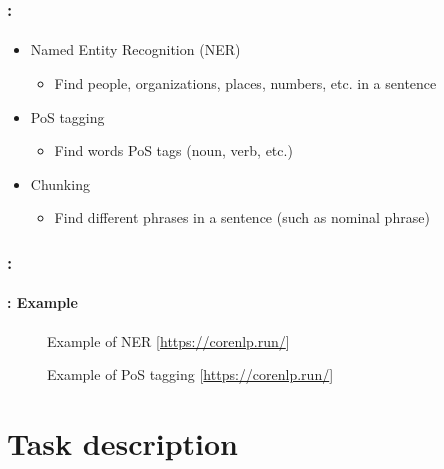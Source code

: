 \documentclass[xcolor=table]{beamer}
\begin{document}
\begin{frame}
	\frametitle{\insertshortsubtitle: \insertsection}
	\framesubtitle{\insertsubsection}

	\begin{itemize}
		\item Named Entity Recognition (NER)
		\begin{itemize}
			\item Find people, organizations, places, numbers, etc. in a sentence
		\end{itemize}
		\item PoS tagging
		\begin{itemize}
			\item Find words PoS tags (noun, verb, etc.)
		\end{itemize}
		\item Chunking
		\begin{itemize}
			\item Find different phrases in a sentence (such as nominal phrase)
		\end{itemize}
	\end{itemize}

\end{frame}

\begin{frame}
	\frametitle{\insertshortsubtitle: \insertsection}
	\framesubtitle{\insertsubsection: Example}

	\begin{figure}
		\centering
		\caption{Example of NER [\url{https://corenlp.run/}]}
	\end{figure}
	
	\begin{figure}
		\centering
		\caption{Example of PoS tagging [\url{https://corenlp.run/}]}
	\end{figure}

\end{frame}


\section{Task description}
\end{document}
